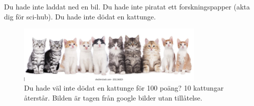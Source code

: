 \noindent

Du hade inte laddat ned en bil. Du hade inte piratat ett forskningspapper (akta dig för sci-hub). Du hade inte dödat en kattunge.

\begin{centering}
    \begin{figure}[h]
        \centering
        \includegraphics[width=0.8\textwidth]{10.png}
        \caption{Du hade väl inte dödat en kattunge för 100 poäng? 10 kattungar återstår. Bilden är tagen från google bilder utan tillåtelse.}
    \end{figure}
\end{centering}

